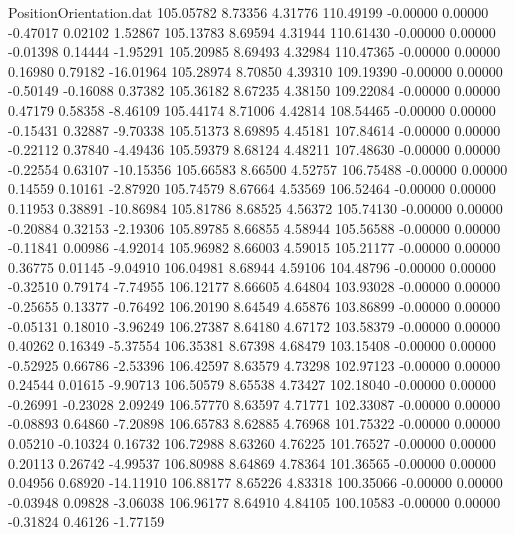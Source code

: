 \begin{filecontents}{PositionOrientation.dat}
 105.05782    8.73356    4.31776   110.49199   -0.00000    0.00000   -0.47017    0.02102    1.52867
 105.13783    8.69594    4.31944   110.61430   -0.00000    0.00000   -0.01398    0.14444   -1.95291
 105.20985    8.69493    4.32984   110.47365   -0.00000    0.00000    0.16980    0.79182  -16.01964
 105.28974    8.70850    4.39310   109.19390   -0.00000    0.00000   -0.50149   -0.16088    0.37382
 105.36182    8.67235    4.38150   109.22084   -0.00000    0.00000    0.47179    0.58358   -8.46109
 105.44174    8.71006    4.42814   108.54465   -0.00000    0.00000   -0.15431    0.32887   -9.70338
 105.51373    8.69895    4.45181   107.84614   -0.00000    0.00000   -0.22112    0.37840   -4.49436
 105.59379    8.68124    4.48211   107.48630   -0.00000    0.00000   -0.22554    0.63107  -10.15356
 105.66583    8.66500    4.52757   106.75488   -0.00000    0.00000    0.14559    0.10161   -2.87920
 105.74579    8.67664    4.53569   106.52464   -0.00000    0.00000    0.11953    0.38891  -10.86984
 105.81786    8.68525    4.56372   105.74130   -0.00000    0.00000   -0.20884    0.32153   -2.19306
 105.89785    8.66855    4.58944   105.56588   -0.00000    0.00000   -0.11841    0.00986   -4.92014
 105.96982    8.66003    4.59015   105.21177   -0.00000    0.00000    0.36775    0.01145   -9.04910
 106.04981    8.68944    4.59106   104.48796   -0.00000    0.00000   -0.32510    0.79174   -7.74955
 106.12177    8.66605    4.64804   103.93028   -0.00000    0.00000   -0.25655    0.13377   -0.76492
 106.20190    8.64549    4.65876   103.86899   -0.00000    0.00000   -0.05131    0.18010   -3.96249
 106.27387    8.64180    4.67172   103.58379   -0.00000    0.00000    0.40262    0.16349   -5.37554
 106.35381    8.67398    4.68479   103.15408   -0.00000    0.00000   -0.52925    0.66786   -2.53396
 106.42597    8.63579    4.73298   102.97123   -0.00000    0.00000    0.24544    0.01615   -9.90713
 106.50579    8.65538    4.73427   102.18040   -0.00000    0.00000   -0.26991   -0.23028    2.09249
 106.57770    8.63597    4.71771   102.33087   -0.00000    0.00000   -0.08893    0.64860   -7.20898
 106.65783    8.62885    4.76968   101.75322   -0.00000    0.00000    0.05210   -0.10324    0.16732
 106.72988    8.63260    4.76225   101.76527   -0.00000    0.00000    0.20113    0.26742   -4.99537
 106.80988    8.64869    4.78364   101.36565   -0.00000    0.00000    0.04956    0.68920  -14.11910
 106.88177    8.65226    4.83318   100.35066   -0.00000    0.00000   -0.03948    0.09828   -3.06038
 106.96177    8.64910    4.84105   100.10583   -0.00000    0.00000   -0.31824    0.46126   -1.77159

\end{filecontents}

